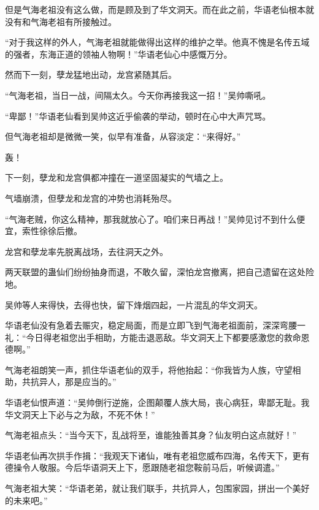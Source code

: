 \begin{this_body}
但是气海老祖没有这么做，而是顾及到了华文洞天。而在此之前，华语老仙根本就没有和气海老祖有所接触过。

“对于我这样的外人，气海老祖就能做得出这样的维护之举。他真不愧是名传五域的强者，东海正道的领袖人物啊！”华语老仙心中感慨万分。

然而下一刻，孽龙猛地出动，龙宫紧随其后。

“气海老祖，当日一战，间隔太久。今天你再接我这一招！”吴帅嘶吼。

“卑鄙！”华语老仙看到吴帅这近乎偷袭的举动，顿时在心中大声咒骂。

但气海老祖却是微微一笑，似早有准备，从容淡定：“来得好。”

轰！

下一刻，孽龙和龙宫俱都冲撞在一道坚固凝实的气墙之上。

气墙崩溃，但孽龙和龙宫的冲势也消耗殆尽。

“气海老贼，你这么精神，那我就放心了。咱们来日再战！”吴帅见讨不到什么便宜，索性徐徐后撤。

龙宫和孽龙率先脱离战场，去往洞天之外。

两天联盟的蛊仙们纷纷抽身而退，不敢久留，深怕龙宫撤离，把自己遗留在这处险地。

吴帅等人来得快，去得也快，留下烽烟四起，一片混乱的华文洞天。

华语老仙没有急着去赈灾，稳定局面，而是立即飞到气海老祖面前，深深弯腰一礼：“今日得老祖您出手相助，方能击退恶敌。华文洞天上下都要感激您的救命恩德啊。”

气海老祖朗笑一声，抓住华语老仙的双手，将他抬起：“你我皆为人族，守望相助，共抗异人，那是应当的。”

华语老仙恨声道：“吴帅倒行逆施，企图颠覆人族大局，丧心病狂，卑鄙无耻。我华文洞天上下必与之为敌，不死不休！”

气海老祖点头：“当今天下，乱战将至，谁能独善其身？仙友明白这点就好！”

华语老仙再次拱手作揖：“我观天下诸仙，唯有老祖您威布四海，名传天下，更有德操令人敬服。今后华语洞天上下，愿跟随老祖您鞍前马后，听候调遣。”

气海老祖大笑：“华语老弟，就让我们联手，共抗异人，包围家园，拼出一个美好的未来吧。”

\end{this_body}

